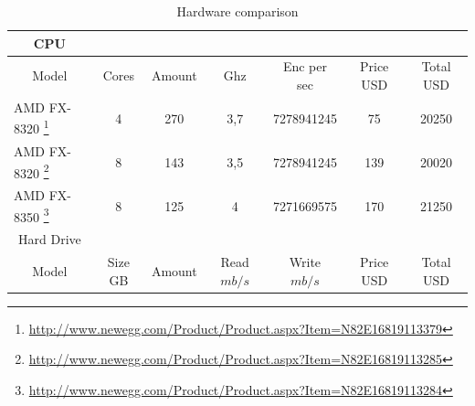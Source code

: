 \begin{table}[H]
\caption{Hardware comparison}
\label{my-label}
\begin{tabular}{|ccccccc}
\hline
\rowcolor[HTML]{EFEFEF}
CPU                                    &                             &                               &                           &                                 &                            & \multicolumn{1}{l|}{\cellcolor[HTML]{EFEFEF}} \\ \hline
\multicolumn{1}{|c|}{Model}            & \multicolumn{1}{c|}{Cores}   & \multicolumn{1}{c|}{Amount} & \multicolumn{1}{c|}{Ghz}  & \multicolumn{1}{c|}{Enc per sec} & \multicolumn{1}{c|}{Price USD} & \multicolumn{1}{c|}{Total USD}                    \\ \hline
\multicolumn{1}{|l|}{AMD FX-8320 \footnote{\url{http://www.newegg.com/Product/Product.aspx?Item=N82E16819113379}} }      & 4                            &270                         & 3,7                       & 7278941245                      & 75                    & 20250                                     \\
\multicolumn{1}{|l|}{AMD FX-8320 \footnote{\url{http://www.newegg.com/Product/Product.aspx?Item=N82E16819113285}} }      & 8                            & 143                         & 3,5                       & 7278941245                      & 139                    & 20020                                     \\
\multicolumn{1}{|l|}{AMD FX-8350 \footnote{\url{http://www.newegg.com/Product/Product.aspx?Item=N82E16819113284}} }      & 8                            & 125                         & 4                         & 7271669575                      & 170                   & 21250                                    \\ \hline
\rowcolor[HTML]{EFEFEF}
Hard Drive                                                          &                               &                           &                                 &                           & & \multicolumn{1}{l|}{\cellcolor[HTML]{EFEFEF}} \\ \hline
\multicolumn{1}{|c|}{Model}            & \multicolumn{1}{c|}{Size GB} & \multicolumn{1}{c|}{Amount} & \multicolumn{1}{c|}{Read $mb/s$} & \multicolumn{1}{c|}{Write $mb/s$}      & \multicolumn{1}{c|}{Price USD} & \multicolumn{1}{c|}{Total USD}                    \\ \hline

\end{tabular}
\end{table}
